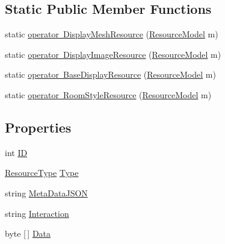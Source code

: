 \subsection*{Static Public Member Functions}
\begin{DoxyCompactItemize}
\item 
static \mbox{\hyperlink{class_virt_muse_web_1_1_models_1_1_resource_model_a2b9e6a172e5359b12f1d697e8f2492cc}{operator Display\+Mesh\+Resource}} (\mbox{\hyperlink{class_virt_muse_web_1_1_models_1_1_resource_model}{Resource\+Model}} m)
\item 
static \mbox{\hyperlink{class_virt_muse_web_1_1_models_1_1_resource_model_a5d037d051f31d4db90f53b067b522f0b}{operator Display\+Image\+Resource}} (\mbox{\hyperlink{class_virt_muse_web_1_1_models_1_1_resource_model}{Resource\+Model}} m)
\item 
static \mbox{\hyperlink{class_virt_muse_web_1_1_models_1_1_resource_model_ac28d152a25bdddba06f1dc0a642b6dea}{operator Base\+Display\+Resource}} (\mbox{\hyperlink{class_virt_muse_web_1_1_models_1_1_resource_model}{Resource\+Model}} m)
\item 
static \mbox{\hyperlink{class_virt_muse_web_1_1_models_1_1_resource_model_ad65176cbe98193e7e8240253148e42fe}{operator Room\+Style\+Resource}} (\mbox{\hyperlink{class_virt_muse_web_1_1_models_1_1_resource_model}{Resource\+Model}} m)
\end{DoxyCompactItemize}
\subsection*{Properties}
\begin{DoxyCompactItemize}
\item 
int \mbox{\hyperlink{class_virt_muse_web_1_1_models_1_1_resource_model_a4abdfed9bc01c5a8fe0c8e9c840db868}{ID}}
\item 
\mbox{\hyperlink{namespace_virt_muse_web_1_1_models_ab185d30c831a1ac813a53670c29d6397}{Resource\+Type}} \mbox{\hyperlink{class_virt_muse_web_1_1_models_1_1_resource_model_adb76d09cc64863a5fd873d90c1a2c67d}{Type}}
\item 
string \mbox{\hyperlink{class_virt_muse_web_1_1_models_1_1_resource_model_a51c87f602c4ba02f7a609da11ca65be9}{Meta\+Data\+J\+S\+ON}}
\item 
string \mbox{\hyperlink{class_virt_muse_web_1_1_models_1_1_resource_model_afa7881621e058917afe83026dc2f5bc1}{Interaction}}
\item 
byte \mbox{[}$\,$\mbox{]} \mbox{\hyperlink{class_virt_muse_web_1_1_models_1_1_resource_model_a6ffb8a92a30539db047cf1ad26c4fd98}{Data}}
\end{DoxyCompactItemize}
